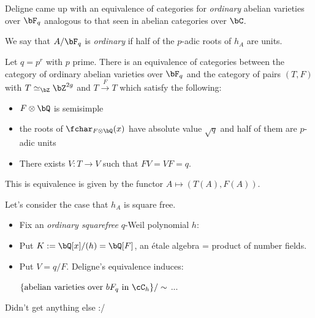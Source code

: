 Deligne came up with an equivalence of categories for \emph{ordinary} abelian varieties over $\bF_q$ analogous to that seen in abelian categories over $\bC$.

We say that $A/\bF_q$ is \emph{ordinary} if half of the $p$-adic roots of $h_A$ are units. 
\begin{thm}[Deligne '69']\label{thm:deligne-equivalence-abelian-char-p-varieties}
	Let $q = p^r$ with $p$ prime. There is an equivalence of categories between the category of ordinary abelian varieties over $\bF_q$ and the category of pairs $(T,F)$ with $T \simeq_\bZ \bZ^{2g}$ and $T \xrightarrow{F}T$ which satisfy the following:
	\begin{itemize}
		\item $F\otimes \bQ$ is semisimple
		\item the roots of $\fchar_{F\otimes \bQ}(x)$ have absolute value $\sqrt{q}$ and half of them are $p$-adic units
		\item There exists $V:T\to V$ such that $FV = VF = q$.
	\end{itemize}
	This is equivalence is given by the functor $A\mapsto (T(A),F(A))$.
\end{thm}

Let's consider the case that $h_A$ is square free.
\begin{itemize}
	\item Fix an \emph{ordinary squarefree} $q$-Weil polynomial $h:$ 
	\item Put $K := \bQ[x]/(h) = \bQ[F]$, an \'etale algebra = product of number fields.
	\item Put $V = q/F$. Deligne's equivalence induces:
	\begin{thm}\label{}
		$ \{\text{abelian varieties over $bF_q$ in $\cC_h$}\}/\sim$ ...
	\end{thm}
\end{itemize}

Didn't get anything else :/

